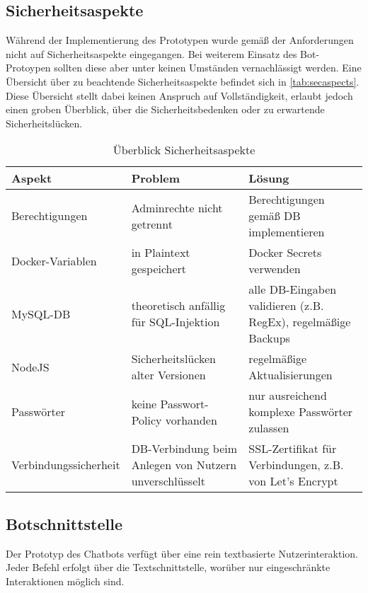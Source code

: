 \subsection{Sicherheitsaspekte}

Während der Implementierung des Prototypen wurde gemäß der Anforderungen nicht auf Sicherheitsaspekte eingegangen. Bei weiterem Einsatz des Bot-Protoypen sollten diese aber unter keinen Umständen vernachlässigt werden. Eine Übersicht über zu beachtende Sicherheitsaspekte befindet sich in \autoref{tab:secaspects}. Diese Übersicht stellt dabei keinen Anspruch auf Vollständigkeit, erlaubt jedoch einen groben Überblick, über die Sicherheitsbedenken oder zu erwartende Sicherheitslücken.

\begin{table}[h]
    \centering
    \begin{tabularx}{\textwidth}{|X|X|X|}
        \hline
        \textbf{Aspekt} & \textbf{Problem} & \textbf{Lösung} \\
        \hline
        Berechtigungen & Adminrechte nicht getrennt & Berechtigungen gemäß DB implementieren \\
        \hline
        Docker-Variablen & in Plaintext gespeichert & Docker Secrets verwenden \\
        \hline
        MySQL-DB & theoretisch anfällig für SQL-Injektion & alle DB-Eingaben validieren (z.B. RegEx), regelmäßige Backups \\
        \hline
        NodeJS & Sicherheitslücken alter Versionen & regelmäßige Aktualisierungen \\
        \hline
        Passwörter & keine Passwort-Policy vorhanden & nur ausreichend komplexe Passwörter zulassen \\
        \hline
        Verbindungssicherheit & DB-Verbindung beim Anlegen von Nutzern unverschlüsselt & SSL-Zertifikat für Verbindungen, z.B. von Let's Encrypt \\
        \hline
    \end{tabularx}
    \caption{Überblick Sicherheitsaspekte}
    \label{tab:secaspects}
\end{table}

\subsection{Botschnittstelle}
\label{sec:botx}
Der Prototyp des Chatbots verfügt über eine rein textbasierte Nutzerinteraktion. Jeder Befehl erfolgt über die Textschnittstelle, worüber nur eingeschränkte Interaktionen möglich sind.

